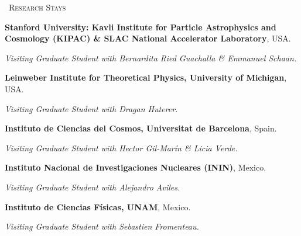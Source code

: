 \begin{rubric}{\faPlane\ \textsc{Research Stays}}

\entry*[July, 2025]
\textbf{Stanford University: Kavli Institute for Particle Astrophysics and Cosmology (KIPAC) \& SLAC National Accelerator Laboratory}, USA. \par
\textit{Visiting Graduate Student with Bernardita Ried Guachalla \& Emmanuel Schaan.}

\textbf{Leinweber Institute for Theoretical Physics, University of Michigan}, USA. \par
\textit{Visiting Graduate Student with Dragan Huterer.}

\textbf{Instituto de Ciencias del Cosmos, Universitat de Barcelona}, Spain. \par
\textit{Visiting Graduate Student with Hector Gil-Marín \& Licia Verde.}

\entry*[2022--2024]
\textbf{Instituto Nacional de Investigaciones Nucleares (ININ)}, Mexico. \par
\textit{Visiting Graduate Student with Alejandro Aviles.}

\textbf{Instituto de Ciencias Físicas, UNAM}, Mexico. \par
\textit{Visiting Graduate Student with Sebastien Fromenteau.}

\end{rubric}